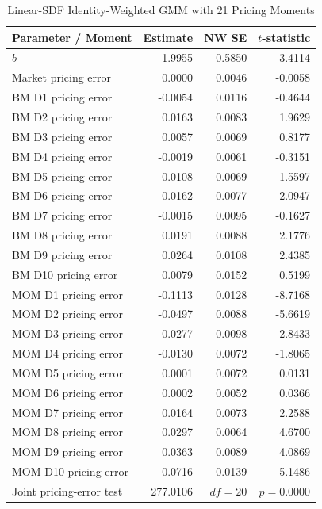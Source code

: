 \documentclass[11pt]{article}
\begin{document}
\begin{table}[H]
  \centering
  \caption{Linear-SDF Identity-Weighted GMM with 21 Pricing Moments}
  \label{tab:4b-gmm}
  \begin{minipage}{0.98\textwidth}
    \centering
    \scriptsize
    \begin{tabular*}{\linewidth}{@{\extracolsep{\fill}}lrrr@{}}
      \toprule
      Parameter / Moment & Estimate & NW SE & $t$-statistic \\
      \midrule
      $\hat{b}$ & 1.9955 & 0.5850 & 3.4114 \\
      Market pricing error & 0.0000 & 0.0046 & -0.0058 \\
      BM D1 pricing error & -0.0054 & 0.0116 & -0.4644 \\
      BM D2 pricing error & 0.0163 & 0.0083 & 1.9629 \\
      BM D3 pricing error & 0.0057 & 0.0069 & 0.8177 \\
      BM D4 pricing error & -0.0019 & 0.0061 & -0.3151 \\
      BM D5 pricing error & 0.0108 & 0.0069 & 1.5597 \\
      BM D6 pricing error & 0.0162 & 0.0077 & 2.0947 \\
      BM D7 pricing error & -0.0015 & 0.0095 & -0.1627 \\
      BM D8 pricing error & 0.0191 & 0.0088 & 2.1776 \\
      BM D9 pricing error & 0.0264 & 0.0108 & 2.4385 \\
      BM D10 pricing error & 0.0079 & 0.0152 & 0.5199 \\
      MOM D1 pricing error & -0.1113 & 0.0128 & -8.7168 \\
      MOM D2 pricing error & -0.0497 & 0.0088 & -5.6619 \\
      MOM D3 pricing error & -0.0277 & 0.0098 & -2.8433 \\
      MOM D4 pricing error & -0.0130 & 0.0072 & -1.8065 \\
      MOM D5 pricing error & 0.0001 & 0.0072 & 0.0131 \\
      MOM D6 pricing error & 0.0002 & 0.0052 & 0.0366 \\
      MOM D7 pricing error & 0.0164 & 0.0073 & 2.2588 \\
      MOM D8 pricing error & 0.0297 & 0.0064 & 4.6700 \\
      MOM D9 pricing error & 0.0363 & 0.0089 & 4.0869 \\
      MOM D10 pricing error & 0.0716 & 0.0139 & 5.1486 \\
      \midrule
      Joint pricing-error test & 277.0106 & $df=20$ & $p=0.0000$ \\
      \bottomrule
    \end{tabular*}


\end{minipage}
\end{table}
\end{document}
